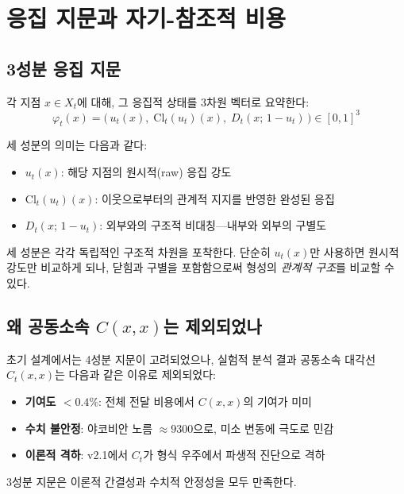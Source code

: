 \section{응집 지문과 자기-참조적 비용}
\label{sec:cohesion-fingerprint}

\subsection{3성분 응집 지문}

각 지점 $x \in X_t$에 대해, 그 응집적 상태를 3차원 벡터로 요약한다:
\begin{equation}
    \varphi_t(x) = \Big(\, u_t(x),\; \mathrm{Cl}_t(u_t)(x),\; D_t(x;\, 1 - u_t) \,\Big) \in [0,1]^3
    \label{eq:fingerprint}
\end{equation}

세 성분의 의미는 다음과 같다:
\begin{itemize}
    \item $u_t(x)$: 해당 지점의 원시적(raw) 응집 강도
    \item $\mathrm{Cl}_t(u_t)(x)$: 이웃으로부터의 관계적 지지를 반영한 완성된 응집
    \item $D_t(x;\, 1 - u_t)$: 외부와의 구조적 비대칭---내부와 외부의 구별도
\end{itemize}

세 성분은 각각 독립적인 구조적 차원을 포착한다. 단순히 $u_t(x)$만 사용하면 원시적 강도만 비교하게 되나, 닫힘과 구별을 포함함으로써 형성의 \emph{관계적 구조}를 비교할 수 있다.

\subsection{왜 공동소속 $C(x,x)$는 제외되었나}

초기 설계에서는 4성분 지문이 고려되었으나, 실험적 분석 결과 공동소속 대각선 $C_t(x,x)$는 다음과 같은 이유로 제외되었다:
\begin{itemize}
    \item \textbf{기여도 $< 0.4\%$}: 전체 전달 비용에서 $C(x,x)$의 기여가 미미
    \item \textbf{수치 불안정}: 야코비안 노름 $\approx 9300$으로, 미소 변동에 극도로 민감
    \item \textbf{이론적 격하}: v2.1에서 $C_t$가 형식 우주에서 파생적 진단으로 격하
\end{itemize}

3성분 지문은 이론적 간결성과 수치적 안정성을 모두 만족한다.

